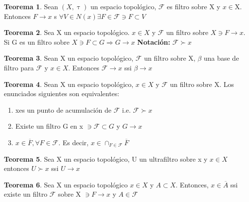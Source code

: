 \documentclass{article}
\theoremstyle{definition}
\newtheorem{theorem}{Teorema}[section]
\begin{document}

\begin{theorem}
	Sean $(X,\uptau)$ un espacio topológico, $\mathcal{F}$ es filtro sobre X y $x\in$X. Entonces $F\to x$ s $\forall V\in N(x)\exists F\in\mathcal{F}\ni F\subset V$
\end{theorem}


\begin{theorem}
	Sea X un espacio topológico. $x\in X$ y $\mathcal{F}$ un filtro sobre $X\ni F\to x$. Si G es un filtro sobre $X\ni F\subset G\Rightarrow G\to x$
	\textbf{Notación: } $\mathcal{F} \succ x$
\end{theorem}


\begin{theorem}
	Sean X un espacio topológico, $\mathcal{F}$ un filtro sobre X, $\beta$ una base de filtro para $\mathcal{F}$ y $x\in X$. Entonces $\mathcal{F}\to x$ ssi $\beta \to x$
\end{theorem}


\begin{theorem}
	Sean X un espacio topológico, $x\in X$ y $\mathcal{F}$ un filtro sobre X. Los enunciados siguientes son equivalentes:
	\begin{enumerate}
		\item xes un punto de acumulación de $\mathcal{F}$ i.e. $\mathcal{F} \succ x$
		\item Existe un filtro G en x $\ni\mathcal{F}\subset G$ y $G\to x$
		\item $x\in \overline{F}, \forall F \in \mathcal{F}$. Es decir, $x\in \cap_{F\in\mathcal{F}}\overline{F}$ 
	\end{enumerate}
\end{theorem}


\begin{theorem}
	Sea X un espacio topológico, U un ultrafiltro sobre x y $x\in X$ entonces $U \succ x$ ssi $U\to x$
\end{theorem}


\begin{theorem}
	Sea X un espacio topológico $x\in X$ y $A\subset X$. Entonces, $x\in\overline{A}$ ssi existe un filtro $\mathcal{F}$ sobre X $\ni F\to x$ y $A\in\mathcal{F}$
\end{theorem}
\end{document}
